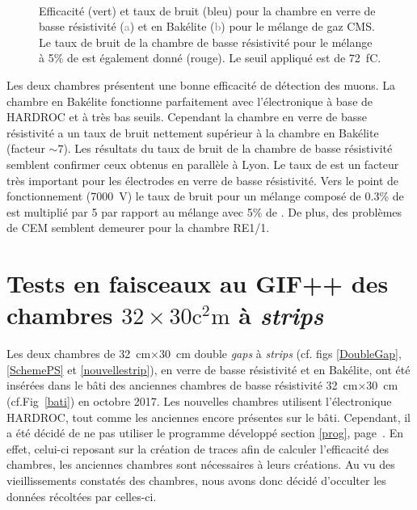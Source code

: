 \begin{figure}[ht!]
	\centering
	\\
	\vspace*{-0.2cm}
	\caption{Efficacité (vert) et taux de bruit (bleu) pour la chambre en verre de basse résistivité (\textcolor{gray}{a}) et en Bakélite (\textcolor{gray}{b}) pour le mélange de gaz CMS. Le taux de bruit de la chambre de basse résistivité pour le mélange à 5\% de  est également donné (rouge). Le seuil appliqué est de \SI{72}{\femto\coulomb}.}
\end{figure}  

Les deux chambres présentent une bonne efficacité de détection des muons. La chambre en Bakélite fonctionne parfaitement avec l'électronique à base de HARDROC et à très bas seuils. Cependant la chambre en verre de basse résistivité a un taux de bruit nettement supérieur à la chambre en Bakélite (facteur $\sim\num{7}$). Les résultats du taux de bruit de la chambre de basse résistivité semblent confirmer ceux obtenus en parallèle à Lyon. Le taux de  est un facteur très important pour les électrodes en verre de basse résistivité. Vers le point de fonctionnement (\SI{7000}{\volt}) le taux de bruit pour un mélange composé de \num{0.3}\% de  est multiplié par \num{5} par rapport au mélange avec \num{5}\% de . De plus, des problèmes de CEM semblent demeurer pour la chambre RE1/1.


\section{Tests en faisceaux au GIF++ des chambres \texorpdfstring{$\num{32}\times\num{30}\si{\square\centi\meter}$}{32cm x 30cm} à \textit{strips}}
\label{GIFF4}
\label{smallchamber}

Les deux chambres de \SI{32}{\centi\meter}$\times$\SI{30}{\centi\meter} double \textit{gaps} à \textit{strips} (cf. figs \ref{DoubleGap}, \ref{SchemePS} et \ref{nouvellestrip}), en verre de basse résistivité et en Bakélite, ont été insérées dans le bâti des anciennes chambres de basse résistivité \SI{32}{\centi\meter}$\times$\SI{30}{\centi\meter} (cf.Fig~\ref{bati}) en octobre 2017. Les nouvelles chambres utilisent l'électronique HARDROC, tout comme les anciennes encore présentes sur le bâti. Cependant, il a été décidé de ne pas utiliser le programme développé section \ref{prog}, page~\pageref{prog}. En effet, celui-ci reposant sur la création de traces afin de calculer l'efficacité des chambres, les anciennes chambres sont nécessaires à leurs créations. Au vu des vieillissements constatés des chambres, nous avons donc décidé d'occulter les données récoltées par celles-ci.

